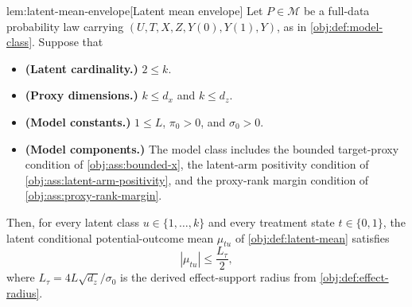 \documentclass[11pt]{article}
\begin{document}
\begin{lemmav}{lem:latent-mean-envelope}[Latent mean envelope]
Let \(P\in\mathcal M\) be a full-data probability law carrying \((U,T,X,Z,Y(0),Y(1),Y)\), as in \cref{obj:def:model-class}.  Suppose that
\begin{itemize}
\item \textbf{(Latent cardinality.)} \(2\le k\).
\item \textbf{(Proxy dimensions.)} \(k\le d_x\) and \(k\le d_z\).
\item \textbf{(Model constants.)} \(1\le L\), \(\pi_0>0\), and \(\sigma_0>0\).
\item \textbf{(Model components.)} The model class includes the bounded target-proxy condition of \cref{obj:ass:bounded-x}, the latent-arm positivity condition of \cref{obj:ass:latent-arm-positivity}, and the proxy-rank margin condition of \cref{obj:ass:proxy-rank-margin}.
\end{itemize}
Then, for every latent class \(u\in\{1,\ldots,k\}\) and every treatment state \(t\in\{0,1\}\), the latent conditional potential-outcome mean \(\mu_{tu}\) of \cref{obj:def:latent-mean} satisfies
\[
|\mu_{tu}|\le \frac{L_\tau}{2},
\]
where \(L_\tau=4L\sqrt{d_z}/\sigma_0\) is the derived effect-support radius from \cref{obj:def:effect-radius}.
\end{lemmav}
\end{document}

